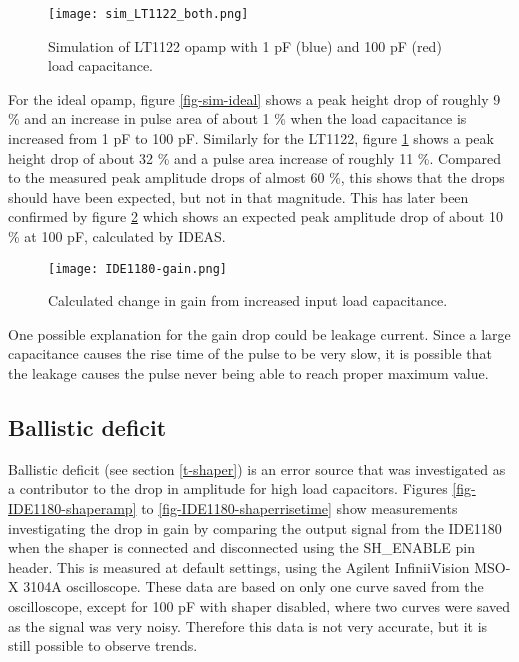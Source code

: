 \documentclass[../main/thesis.tex]{subfiles}
\begin{document}
\begin{figure}%
	\centering
	\texttt{[image: sim\_LT1122\_both.png]}
	\caption{Simulation of LT1122 \gls{opamp} with 1 pF (blue) and 100 pF (red) load capacitance.}
	\label{fig-sim-LT1122}
\end{figure} 

For the ideal \gls{opamp}, figure \ref{fig-sim-ideal} shows a peak height drop of roughly 9 \% and an increase in pulse area of about 1 \% when the load capacitance is increased from 1 pF to 100 pF. Similarly for the LT1122, figure \ref{fig-sim-LT1122} shows a peak height drop of about 32 \% and a pulse area increase of roughly 11 \%. Compared to the measured peak amplitude drops of almost 60 \%, this shows that the drops should have been expected, but not in that magnitude. This has later been confirmed by figure \ref{fig-ide-gain} which shows an expected peak amplitude drop of about 10 \% at 100 pF, calculated by IDEAS. 

\begin{figure}%
	\centering
	\texttt{[image: IDE1180-gain.png]}
	\caption{Calculated change in gain from increased input load capacitance. \citep{IDE1180email}}
	\label{fig-ide-gain}
\end{figure} 

One possible explanation for the gain drop could be leakage current. Since a large capacitance causes the rise time of the pulse to be very slow, it is possible that the leakage causes the pulse never being able to reach proper maximum value. 

\subsection{Ballistic deficit}
\label{ide-gain-ballistic}

Ballistic deficit (see section \ref{t-shaper}) is an error source that was investigated as a contributor to the drop in amplitude for high load capacitors. Figures \ref{fig-IDE1180-shaperamp} to \ref{fig-IDE1180-shaperrisetime} show measurements investigating the drop in gain by comparing the output signal from the IDE1180 when the shaper is connected and disconnected using the SH\_ENABLE pin header. This is measured at default settings, using the Agilent InfiniiVision MSO-X 3104A oscilloscope. These data are based on only one curve saved from the oscilloscope, except  for 100 pF with shaper disabled, where two curves were saved as the signal was very noisy. Therefore this data is not very accurate, but it is still possible to observe trends. 
\end{document}

